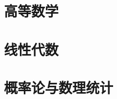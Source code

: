 \documentclass{book}
\title{\documentTitle}
\author{\documentAuthor}
\date{\today}
\begin{document}
	\maketitle
	\setcounter{secnumdepth}{4}
	\tableofcontents

	\part{高等数学}

	
	\part{线性代数}
%	
%	
%	
%	
%	
%	
	
	\part{概率论与数理统计}
%	
%	
%	
%	
%	
%	
%	
%	
%	
%	
%	
%	
\end{document}
